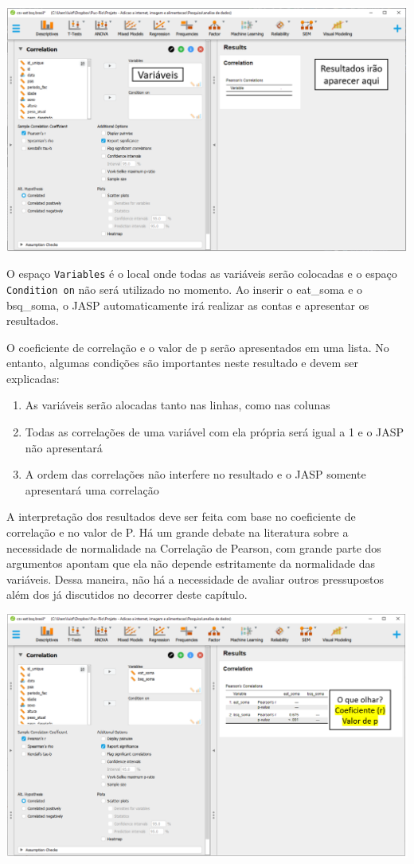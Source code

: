 \documentclass[
]{book}
\providecommand{\tightlist}{%
  \setlength{\itemsep}{0pt}\setlength{\parskip}{0pt}}
\begin{document}
\includegraphics{./img/cap_correlacao_interface2.png}

O espaço \texttt{Variables} é o local onde todas as variáveis serão colocadas e o espaço \texttt{Condition\ on} não será utilizado no momento. Ao inserir o eat\_soma e o bsq\_soma, o JASP automaticamente irá realizar as contas e apresentar os resultados.

O coeficiente de correlação e o valor de p serão apresentados em uma lista. No entanto, algumas condições são importantes neste resultado e devem ser explicadas:

\begin{enumerate}
\def\labelenumi{\arabic{enumi}.}
\tightlist
\item
  As variáveis serão alocadas tanto nas linhas, como nas colunas\\
\item
  Todas as correlações de uma variável com ela própria será igual a 1 e o JASP não apresentará\\
\item
  A ordem das correlações não interfere no resultado e o JASP somente apresentará uma correlação
\end{enumerate}

A interpretação dos resultados deve ser feita com base no coeficiente de correlação e no valor de P. Há um grande debate na literatura sobre a necessidade de normalidade na Correlação de Pearson, com grande parte dos argumentos apontam que ela não depende estritamente da normalidade das variáveis. Dessa maneira, não há a necessidade de avaliar outros pressupostos além dos já discutidos no decorrer deste capítulo.

\includegraphics{./img/cap_correlacao_resultados.png}
\end{document}
